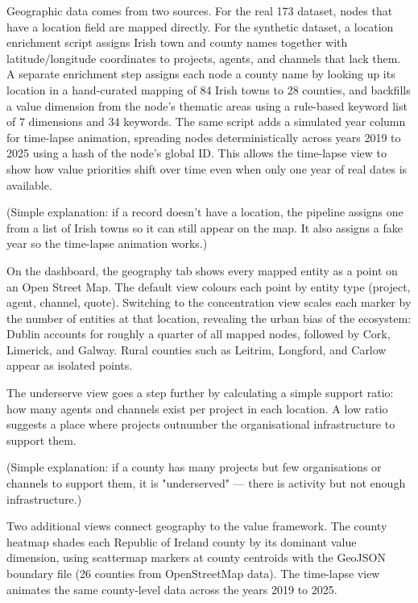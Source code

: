 \documentclass[11pt,a4paper]{article}
\begin{document}
Geographic data comes from two sources. For the real 173 dataset, nodes
that have a location field are mapped directly. For the synthetic
dataset, a location enrichment script assigns Irish town and county
names together with latitude/longitude coordinates to projects, agents,
and channels that lack them. A separate enrichment step assigns each
node a county name by looking up its location in a hand-curated mapping
of 84 Irish towns to 28 counties, and backfills a value dimension from
the node's thematic areas using a rule-based keyword list of 7
dimensions and 34 keywords. The same script adds a simulated year column
for time-lapse animation, spreading nodes deterministically across years
2019 to 2025 using a hash of the node's global ID. This allows the
time-lapse view to show how value priorities shift over time even when
only one year of real dates is available.

(Simple explanation: if a record doesn't have a location, the pipeline
assigns one from a list of Irish towns so it can still appear on the
map. It also assigns a fake year so the time-lapse animation works.)

On the dashboard, the geography tab shows every mapped entity as a point
on an Open Street Map. The default view colours each point by entity
type (project, agent, channel, quote). Switching to the concentration
view scales each marker by the number of entities at that location,
revealing the urban bias of the ecosystem: Dublin accounts for roughly a
quarter of all mapped nodes, followed by Cork, Limerick, and Galway.
Rural counties such as Leitrim, Longford, and Carlow appear as isolated
points.

The underserve view goes a step further by calculating a simple support
ratio: how many agents and channels exist per project in each location.
A low ratio suggests a place where projects outnumber the organisational
infrastructure to support them.

(Simple explanation: if a county has many projects but few organisations
or channels to support them, it is "underserved" — there is activity but
not enough infrastructure.)

Two additional views connect geography to the value framework. The
county heatmap shades each Republic of Ireland county by its dominant
value dimension, using scattermap markers at county centroids with the
GeoJSON boundary file (26 counties from OpenStreetMap data). The
time-lapse view animates the same county-level data across the years
2019 to 2025.
\end{document}
